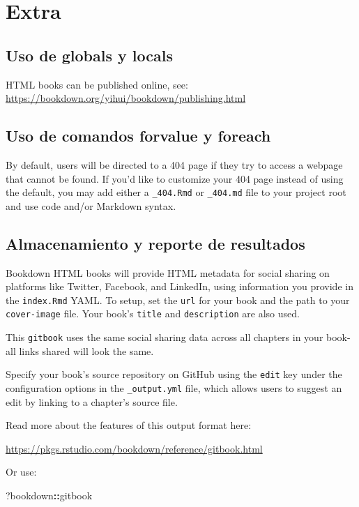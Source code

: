 \documentclass[
]{book}
\newenvironment{Shaded}{\begin{snugshade}}{\end{snugshade}}
\newcommand{\NormalTok}[1]{#1}
\newcommand{\SpecialCharTok}[1]{\textcolor[rgb]{0.81,0.36,0.00}{\textbf{#1}}}
\theoremstyle{definition}
\theoremstyle{definition}
\theoremstyle{definition}
\theoremstyle{definition}
\theoremstyle{remark}
\begin{document}
\hypertarget{extra}{%
\chapter{Extra}\label{extra}}

\hypertarget{uso-de-globals-y-locals}{%
\section{Uso de globals y locals}\label{uso-de-globals-y-locals}}

HTML books can be published online, see: \url{https://bookdown.org/yihui/bookdown/publishing.html}

\hypertarget{uso-de-comandos-forvalue-y-foreach}{%
\section{Uso de comandos forvalue y foreach}\label{uso-de-comandos-forvalue-y-foreach}}

By default, users will be directed to a 404 page if they try to access a webpage that cannot be found. If you'd like to customize your 404 page instead of using the default, you may add either a \texttt{\_404.Rmd} or \texttt{\_404.md} file to your project root and use code and/or Markdown syntax.

\hypertarget{almacenamiento-y-reporte-de-resultados}{%
\section{Almacenamiento y reporte de resultados}\label{almacenamiento-y-reporte-de-resultados}}

Bookdown HTML books will provide HTML metadata for social sharing on platforms like Twitter, Facebook, and LinkedIn, using information you provide in the \texttt{index.Rmd} YAML. To setup, set the \texttt{url} for your book and the path to your \texttt{cover-image} file. Your book's \texttt{title} and \texttt{description} are also used.

This \texttt{gitbook} uses the same social sharing data across all chapters in your book- all links shared will look the same.

Specify your book's source repository on GitHub using the \texttt{edit} key under the configuration options in the \texttt{\_output.yml} file, which allows users to suggest an edit by linking to a chapter's source file.

Read more about the features of this output format here:

\url{https://pkgs.rstudio.com/bookdown/reference/gitbook.html}

Or use:

\begin{Shaded}
\begin{Highlighting}[]
\NormalTok{?bookdown}\SpecialCharTok{::}\NormalTok{gitbook}
\end{Highlighting}
\end{Shaded}


  
\end{document}
